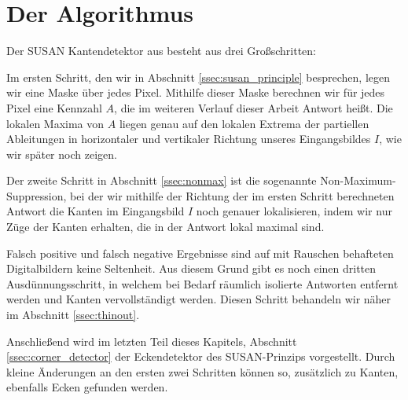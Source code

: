 \documentclass[a4paper, 11pt]{report}
\theoremstyle{definition}
\begin{document}
	\section{Der Algorithmus}\label{sec:thealgorithm}
		Der SUSAN Kantendetektor aus \cite{SUSAN} besteht aus drei Großschritten:

		Im ersten Schritt, den wir in Abschnitt \ref{ssec:susan_principle} besprechen, legen wir eine Maske über jedes Pixel. Mithilfe dieser Maske berechnen wir für jedes Pixel eine Kennzahl $A$, die im weiteren Verlauf dieser Arbeit \glqq Antwort\grqq{} heißt. Die lokalen Maxima von $A$ liegen genau auf den lokalen Extrema der partiellen Ableitungen in horizontaler und vertikaler Richtung unseres Eingangsbildes $I$, wie wir später noch zeigen.

		Der zweite Schritt in Abschnitt \ref{ssec:nonmax} ist die sogenannte Non-Maximum-Suppression, bei der wir mithilfe der Richtung der im ersten Schritt berechneten Antwort die Kanten im Eingangsbild $I$ noch genauer lokalisieren, indem wir nur Züge der Kanten erhalten, die in der Antwort lokal maximal sind.

		Falsch positive und falsch negative Ergebnisse sind auf mit Rauschen behafteten Digitalbildern keine Seltenheit. Aus diesem Grund gibt es noch einen dritten Ausdünnungsschritt, in welchem bei Bedarf räumlich isolierte Antworten entfernt werden und Kanten vervollständigt werden. Diesen Schritt behandeln wir näher im Abschnitt \ref{ssec:thinout}.

		Anschließend wird im letzten Teil dieses Kapitels, Abschnitt \ref{ssec:corner_detector} der Eckendetektor des SUSAN-Prinzips vorgestellt. Durch kleine Änderungen an den ersten zwei Schritten können so, zusätzlich zu Kanten, ebenfalls Ecken gefunden werden.
\end{document}
